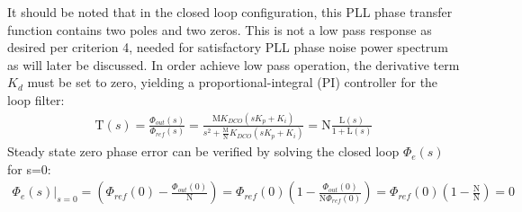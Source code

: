 	It should be noted that in the closed loop configuration, this PLL phase transfer function contains two poles and two zeros. This is not a low pass response as desired per criterion 4, needed for satisfactory PLL phase noise power spectrum as will later be discussed. In order achieve low pass operation, the derivative term $K_d$ must be set to zero, yielding a proportional-integral (PI) controller for the loop filter:
	\begin{align} \label{eq:full_pi_pll_tf}
		\mathrm{T}(s) = \frac{\Phi_{out}(s)}{\Phi_{ref}(s)} = \frac{\mathrm{M}K_{DCO}\left(sK_p + K_i\right)}{s^2 + \frac{\mathrm{M}}{\mathrm{N}}K_{DCO}\left(sK_p + K_i\right)} = \mathrm{N}\frac{\mathrm{L}(s)}{1 + \mathrm{L}(s)} 
	\end{align}
	Steady state zero phase error can be verified by solving the closed loop $\Phi_e(s)$ for s=0:
	\begin{align}
		\left.\Phi_e(s)\right\vert_{s=0} = \left(\Phi_{ref}(0) - \frac{\Phi_{out}(0)}{\mathrm{N}}\right) = \Phi_{ref}(0)\left(1 - \frac{\Phi_{out}(0)}{\mathrm{N}\Phi_{ref}(0)}\right)= \Phi_{ref}(0)\left(1 - \frac{\mathrm{N}}{\mathrm{N}}\right) = 0
	\end{align}


